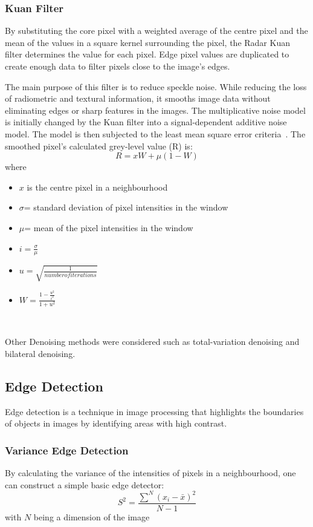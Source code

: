 \documentclass[a4paper, 12pt]{report}
\begin{document}
\subsubsection{Kuan Filter}
By substituting the core pixel with a weighted average of the centre pixel and the mean of the values in a square kernel surrounding the pixel, the Radar Kuan filter determines the value for each pixel. Edge pixel values are duplicated to create enough data to filter pixels close to the image's edges.

The main purpose of this filter is to reduce speckle noise. While reducing the loss of radiometric and textural information, it smooths image data without eliminating edges or sharp features in the images. The multiplicative noise model is initially changed by the Kuan filter into a signal-dependent additive noise model. The model is then subjected to the least mean square error criteria~\cite{kuan_filter_2022}. The smoothed pixel's calculated grey-level value (R) is:
\[R=xW+\mu(1-W)\]
where
\begin{itemize}
    \item \(x\) is the centre pixel in a neighbourhood
    \item \(\sigma\)= standard deviation of pixel intensities in the window
    \item \(\mu\)= mean of the pixel intensities in the window
    \item \(i=\frac{\sigma}{\mu}\)
    \item \(u=\sqrt{\frac{1}{number of iterations}}\)
    \item \(W=\frac{1-\frac{u^2}{i^2}}{1+u^2}\)
\end{itemize}
~\cite{kuan_filter_2022}\par

Other Denoising methods were considered such as total-variation denoising and bilateral denoising.

\subsection{Edge Detection}
Edge detection is a technique in image processing that highlights the boundaries of objects in images by identifying areas with high contrast.

\subsubsection{Variance Edge Detection}
By calculating the variance of the intensities of pixels in a neighbourhood, one can construct a simple basic edge detector:
\[S^2=\frac{\sum^N{(x_i-\bar{x})^2}}{N-1}\]
with $N$ being a dimension of the image
\end{document}
